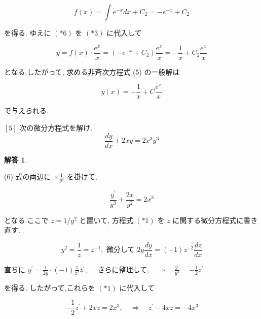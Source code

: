 \documentclass[10pt]{jsarticle}
\newtheorem*{answer*}{解答}
\begin{document}
\begin{equation*}
f(x)=\int e^{-x} d x+C_{2}=-e^{-x}+C_{2} \tag{*6}
\end{equation*}


を得る. ゆえに $(* 6)$ を $(* 3)$ に代入して


\begin{equation*}
y=f(x) \cdot \frac{e^{x}}{x}=\left(-e^{-x}+C_{2}\right) \frac{e^{x}}{x}=-\frac{1}{x}+C_{2} \frac{e^{x}}{x} \tag{*7}
\end{equation*}


となる.したがって, 求める非斉次方程式 (5) の一般解は


\begin{equation*}
y(x)=-\frac{1}{x}+C \frac{e^{x}}{x} \tag{*8}
\end{equation*}


で与えられる.

\bigskip

\begin{itembox}[l]{$[5]$ 次の微分方程式を解け.}
\begin{equation*}
\frac{d y}{d x}+2 x y=2 x^{3} y^{3} \tag{6}
\end{equation*}  
\end{itembox}

\bigskip

\begin{answer*}
\end{answer*}

(6) 式の両辺に $\times \frac{1}{y^{3}}$ を掛けて,


\begin{equation*}
\frac{y^{\prime}}{y^{3}}+\frac{2 x}{y^{2}}=2 x^{3} \tag{*1}
\end{equation*}


となる.ここで $z=1 / y^{2}$ と置いて, 方程式 $(* 1)$ を $z$ に関する微分方程式に書き直す.

$$
y^{2}=\frac{1}{z}=z^{-1}, \text { 微分して } 2 y \frac{d y}{d x}=(-1) z^{-2} \frac{d z}{d x}
$$

直ちに $y^{\prime}=\frac{1}{2 y} \cdot(-1) \frac{1}{z^{2}} z^{\prime}, \quad$ さらに整理して,$\quad \Longrightarrow \quad \frac{y^{\prime}}{y^{3}}=-\frac{1}{2} z^{\prime}$

を得る. したがって,これらを $(* 1)$ に代入して


\begin{equation*}
-\frac{1}{2} z^{\prime}+2 x z=2 x^{3}, \quad \Longrightarrow \quad z^{\prime}-4 x z=-4 x^{3} \tag{*3}
\end{equation*}
\end{document}
